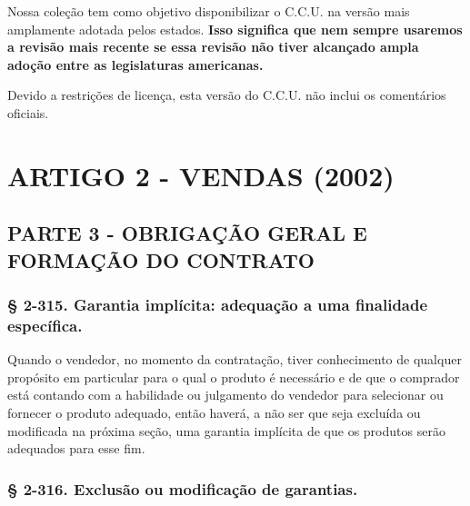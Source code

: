 \documentclass[a4paper, 12pt]{article}
\begin{document}
Nossa coleção tem como objetivo disponibilizar o C.C.U. na versão mais amplamente adotada pelos estados. \textbf{Isso significa que nem sempre usaremos a revisão mais recente se essa revisão não tiver alcançado ampla adoção entre as legislaturas americanas.}

\vspace{5mm}

Devido a restrições de licença, esta versão do C.C.U. não inclui os comentários oficiais.

\pagebreak

\tableofcontents

\pagebreak

\section{ARTIGO 2 - VENDAS (2002)}

\subsection{PARTE 3 - OBRIGAÇÃO GERAL E FORMAÇÃO DO CONTRATO}

\subsubsection{§ 2-315. Garantia implícita: adequação a uma finalidade específica.}

Quando o vendedor, no momento da contratação, tiver conhecimento de qualquer propósito em particular para o qual o produto é necessário e de que o comprador está contando com a habilidade ou julgamento do vendedor para selecionar ou fornecer o produto adequado, então haverá, a não ser que seja excluída ou modificada na próxima seção, uma garantia implícita de que os produtos serão adequados para esse fim.

\subsubsection{§ 2-316. Exclusão ou modificação de garantias.}
\end{document}
